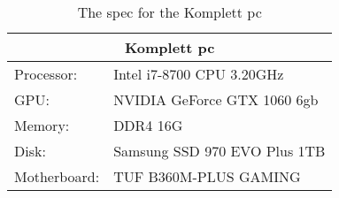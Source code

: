 \begin{table}[]
    \begin{tabular}{ll}
    \hline
    \multicolumn{2}{|c|}{Komplett pc}           \\ \hline
    Processor:   & Intel i7-8700 CPU 3.20GHz    \\
    GPU:         & NVIDIA GeForce GTX 1060 6gb  \\
    Memory:      & DDR4 16G                     \\
    Disk:        & Samsung SSD 970 EVO Plus 1TB \\
    Motherboard: & TUF B360M-PLUS GAMING       
    \end{tabular}
    \caption{The spec for the Komplett pc}
    \end{table}